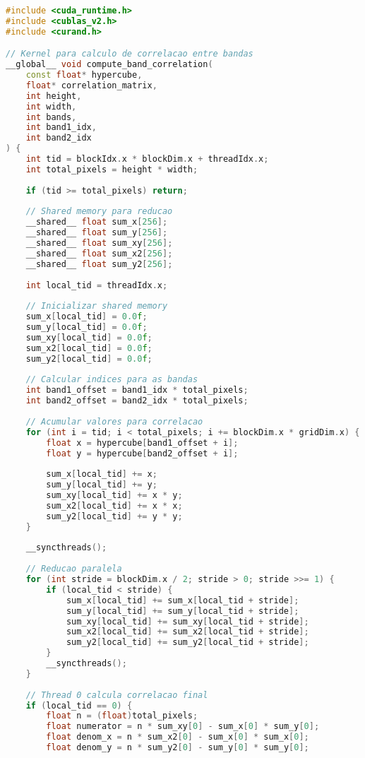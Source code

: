 \begin{lstlisting}[language=C++]
#include <cuda_runtime.h>
#include <cublas_v2.h>
#include <curand.h>

// Kernel para calculo de correlacao entre bandas
__global__ void compute_band_correlation(
    const float* hypercube,
    float* correlation_matrix,
    int height,
    int width,
    int bands,
    int band1_idx,
    int band2_idx
) {
    int tid = blockIdx.x * blockDim.x + threadIdx.x;
    int total_pixels = height * width;
    
    if (tid >= total_pixels) return;
    
    // Shared memory para reducao
    __shared__ float sum_x[256];
    __shared__ float sum_y[256];
    __shared__ float sum_xy[256];
    __shared__ float sum_x2[256];
    __shared__ float sum_y2[256];
    
    int local_tid = threadIdx.x;
    
    // Inicializar shared memory
    sum_x[local_tid] = 0.0f;
    sum_y[local_tid] = 0.0f;
    sum_xy[local_tid] = 0.0f;
    sum_x2[local_tid] = 0.0f;
    sum_y2[local_tid] = 0.0f;
    
    // Calcular indices para as bandas
    int band1_offset = band1_idx * total_pixels;
    int band2_offset = band2_idx * total_pixels;
    
    // Acumular valores para correlacao
    for (int i = tid; i < total_pixels; i += blockDim.x * gridDim.x) {
        float x = hypercube[band1_offset + i];
        float y = hypercube[band2_offset + i];
        
        sum_x[local_tid] += x;
        sum_y[local_tid] += y;
        sum_xy[local_tid] += x * y;
        sum_x2[local_tid] += x * x;
        sum_y2[local_tid] += y * y;
    }
    
    __syncthreads();
    
    // Reducao paralela
    for (int stride = blockDim.x / 2; stride > 0; stride >>= 1) {
        if (local_tid < stride) {
            sum_x[local_tid] += sum_x[local_tid + stride];
            sum_y[local_tid] += sum_y[local_tid + stride];
            sum_xy[local_tid] += sum_xy[local_tid + stride];
            sum_x2[local_tid] += sum_x2[local_tid + stride];
            sum_y2[local_tid] += sum_y2[local_tid + stride];
        }
        __syncthreads();
    }
    
    // Thread 0 calcula correlacao final
    if (local_tid == 0) {
        float n = (float)total_pixels;
        float numerator = n * sum_xy[0] - sum_x[0] * sum_y[0];
        float denom_x = n * sum_x2[0] - sum_x[0] * sum_x[0];
        float denom_y = n * sum_y2[0] - sum_y[0] * sum_y[0];
        

\end{lstlisting}
